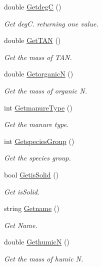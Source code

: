 \begin{DoxyCompactItemize}
double \mbox{\hyperlink{classmanure_a3b2b4dd4590499b9d1ded6d48c75e06e}{GetdegC}} ()
\begin{DoxyCompactList}\small\item\em Get degC. returning one value. \end{DoxyCompactList}\item 
double \mbox{\hyperlink{classmanure_a4461f5f0c8d8f868b5e2f78d91e6cb09}{Get\+T\+AN}} ()
\begin{DoxyCompactList}\small\item\em Get the mass of T\+AN. \end{DoxyCompactList}\item 
double \mbox{\hyperlink{classmanure_aaeebf31f0706d0c07683b4137df7d8dd}{GetorganicN}} ()
\begin{DoxyCompactList}\small\item\em Get the mass of organic N. \end{DoxyCompactList}\item 
int \mbox{\hyperlink{classmanure_ad1c01d702d92e6863874aeb5868a01b4}{Getmanure\+Type}} ()
\begin{DoxyCompactList}\small\item\em Get the manure type. \end{DoxyCompactList}\item 
int \mbox{\hyperlink{classmanure_abe75269a2d8ba54fff5eb448a1d6352d}{Getspecies\+Group}} ()
\begin{DoxyCompactList}\small\item\em Get the species group. \end{DoxyCompactList}\item 
bool \mbox{\hyperlink{classmanure_a374d7b59e1477492b3ce60b11b86c7f3}{Getis\+Solid}} ()
\begin{DoxyCompactList}\small\item\em Get is\+Solid. \end{DoxyCompactList}\item 
string \mbox{\hyperlink{classmanure_a128dec8040ac78a9b969c060d9732317}{Getname}} ()
\begin{DoxyCompactList}\small\item\em Get Name. \end{DoxyCompactList}\item 
double \mbox{\hyperlink{classmanure_a74c747509def8fb631dd3e37eb20aefb}{GethumicN}} ()
\begin{DoxyCompactList}\small\item\em Get the mass of humic N. \end{DoxyCompactList}\item 

\end{DoxyCompactItemize}
